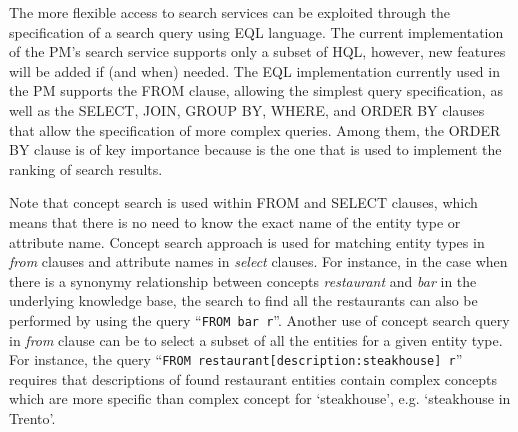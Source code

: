The more flexible access to search services can be exploited through the specification of a search query using EQL language. The current implementation of the PM's search service supports only a subset of HQL, however, new features will be added if (and when) needed. The EQL implementation currently used in the PM supports the FROM clause, allowing the simplest query specification, as well as the SELECT, JOIN, GROUP BY, WHERE, and ORDER BY clauses that allow the specification of more complex queries. Among them, the ORDER BY clause is of key importance because is the one that is used to implement the ranking of search results. 

Note that concept search is used within FROM and SELECT clauses, which means that there is no need to know the exact name of the entity type or attribute name. Concept search approach is used for matching entity types in \emph{from} clauses and attribute names in \emph{select} clauses. 
 For instance, in the case when there is a synonymy relationship between concepts \emph{restaurant} and \emph{bar} in the underlying knowledge base, the search to find all the restaurants can also be performed by using the query ``\texttt{FROM bar r}''.
Another use of concept search query in \emph{from} clause can be to select a subset of all the entities for a given entity type. For instance, the query ``\texttt{FROM restaurant[description:steakhouse] r}'' requires that descriptions of found restaurant entities contain complex concepts which are more specific than complex concept for `steakhouse', e.g. `steakhouse in Trento'.



